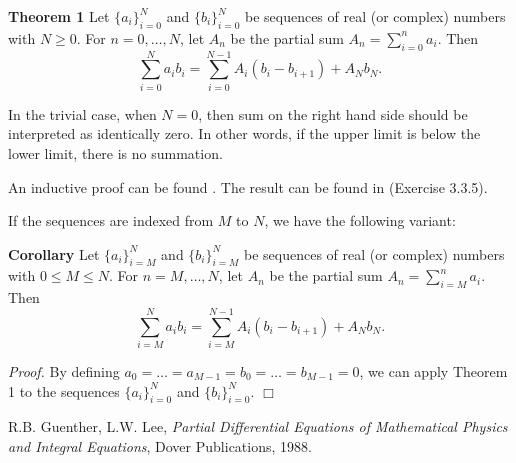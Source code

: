 \documentclass[12pt]{article}
\begin{document}
{\bf Theorem 1 } Let 
$\{a_i\}_{i=0}^N$ and $\{b_i\}_{i=0}^N$ be sequences of 
real  (or complex) numbers with $N\ge 0$. 
For $n=0,\ldots, N$, let $A_n$ be the  partial sum
$A_n=\sum_{i=0}^na_i$.
Then 
$$\sum_{i=0}^N a_i b_i = \sum_{i=0}^{N-1}A_i(b_i-b_{i+1})+A_N b_N.$$

In the trivial case, when $N=0$, then sum on the right hand side
should be interpreted as identically zero. In other words, 
if the upper limit is below the lower limit, there is no summation. 

An inductive proof can be found . 
The result can be found in \cite{guenther} (Exercise 3.3.5).

If the sequences are indexed from $M$ to $N$, we have the following 
variant:

{\bf Corollary}
Let $\{a_i\}_{i=M}^N$ and $\{b_i\}_{i=M}^N$ be sequences of 
real  (or complex) numbers with $0\le M \le N$. 
For $n=M,\ldots, N$, let $A_n$ be the  partial sum
$A_n=\sum_{i=M}^na_i$.
Then 
$$\sum_{i=M}^N a_i b_i = \sum_{i=M}^{N-1}A_i(b_i-b_{i+1})+A_N b_N.$$

\emph{Proof.} By defining
$a_0=\ldots =a_{M-1}=b_0=\ldots =b_{M-1} =0$, we can apply Theorem 1
to the sequences $\{a_i\}_{i=0}^N$ and $\{b_i\}_{i=0}^N$.
$\Box$
 
\begin{thebibliography}{9}
R.B. Guenther, L.W. Lee,
\emph{Partial Differential Equations of Mathematical Physics and Integral Equations},
Dover Publications, 1988.
\end{thebibliography}
\end{document}
